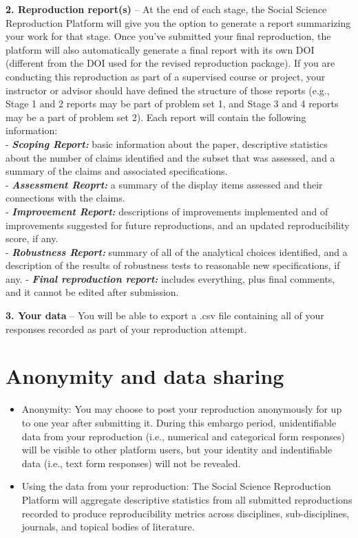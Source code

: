 \documentclass[
]{book}
\begin{document}
\textbf{2. Reproduction report(s)} -- At the end of each stage, the Social Science Reproduction Platform will give you the option to generate a report summarizing your work for that stage. Once you've submitted your final reproduction, the platform will also automatically generate a final report with its own DOI (different from the DOI used for the revised reproduction package). If you are conducting this reproduction as part of a supervised course or project, your instructor or advisor should have defined the structure of those reports (e.g., Stage 1 and 2 reports may be part of problem set 1, and Stage 3 and 4 reports may be a part of problem set 2). Each report will contain the following information:\\
- \textbf{\emph{Scoping Report:}} basic information about the paper, descriptive statistics about the number of claims identified and the subset that was assessed, and a summary of the claims and associated specifications.\\
- \textbf{\emph{Assessment Reoprt:}} a summary of the display items assessed and their connections with the claims.\\
- \textbf{\emph{Improvement Report:}} descriptions of improvements implemented and of improvements suggested for future reproductions, and an updated reproducibility score, if any.\\
- \textbf{\emph{Robustness Report:}} summary of all of the analytical choices identified, and a description of the results of robustness tests to reasonable new specifications, if any.
- \textbf{\emph{Final reproduction report:}} includes everything, plus final comments, and it cannot be edited after submission.

\textbf{3. Your data} -- You will be able to export a .csv file containing all of your responses recorded as part of your reproduction attempt.

\hypertarget{anonymity-and-data-sharing}{%
\section{Anonymity and data sharing}\label{anonymity-and-data-sharing}}

\begin{itemize}
\item
  Anonymity: You may choose to post your reproduction anonymously for up to one year after submitting it. During this embargo period, unidentifiable data from your reproduction (i.e., numerical and categorical form responses) will be visible to other platform users, but your identity and indentifiable data (i.e., text form responses) will not be revealed.
\item
  Using the data from your reproduction: The Social Science Reproduction Platform will aggregate descriptive statistics from all submitted reproductions recorded to produce reproducibility metrics across disciplines, sub-disciplines, journals, and topical bodies of literature.
\end{itemize}
\end{document}
